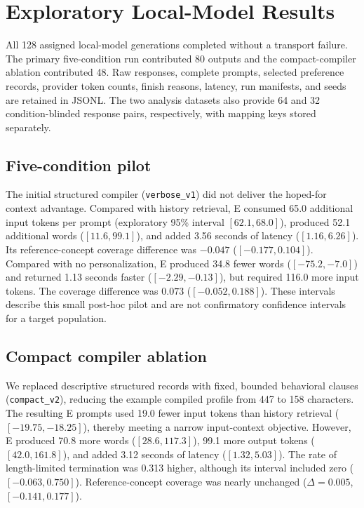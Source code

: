 \section{Exploratory Local-Model Results}
\label{sec:results}

All 128 assigned local-model generations completed without a transport failure.
The primary five-condition run contributed 80 outputs and the compact-compiler
ablation contributed 48. Raw responses, complete prompts, selected preference
records, provider token counts, finish reasons, latency, run manifests, and seeds
are retained in JSONL. The two analysis datasets also provide 64 and 32
condition-blinded response pairs, respectively, with mapping keys stored separately.

\subsection{Five-condition pilot}

The initial structured compiler (\texttt{verbose\_v1}) did not deliver the hoped-for
context advantage. Compared with history retrieval, E consumed 65.0 additional
input tokens per prompt (exploratory 95\% interval $[62.1,68.0]$), produced 52.1
additional words ($[11.6,99.1]$), and added 3.56 seconds of latency
($[1.16,6.26]$). Its reference-concept coverage difference was $-0.047$
($[-0.177,0.104]$). Compared with no personalization, E produced 34.8 fewer words
($[-75.2,-7.0]$) and returned 1.13 seconds faster ($[-2.29,-0.13]$), but required
116.0 more input tokens. The coverage difference was $0.073$
($[-0.052,0.188]$). These intervals describe this small post-hoc pilot and are not
confirmatory confidence intervals for a target population.

\subsection{Compact compiler ablation}

We replaced descriptive structured records with fixed, bounded behavioral clauses
(\texttt{compact\_v2}), reducing the example compiled profile from 447 to 158
characters. The resulting E prompts used 19.0 fewer input tokens than history
retrieval ($[-19.75,-18.25]$), thereby meeting a narrow input-context objective.
However, E produced 70.8 more words ($[28.6,117.3]$), 99.1 more output tokens
($[42.0,161.8]$), and added 3.12 seconds of latency ($[1.32,5.03]$). The rate of
length-limited termination was 0.313 higher, although its interval included zero
($[-0.063,0.750]$). Reference-concept coverage was nearly unchanged
($\Delta=0.005$, $[-0.141,0.177]$).

